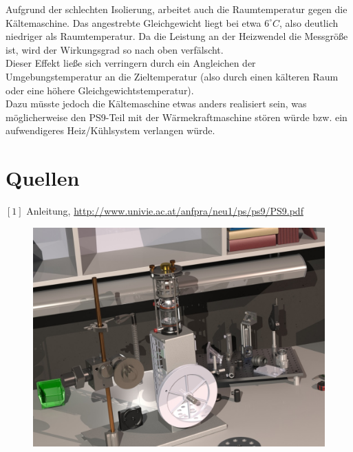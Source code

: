 \documentclass[12pt,a4paper]{article}
\begin{document}
\begin{multicols}{2}
\noindent Aufgrund der schlechten Isolierung, arbeitet auch die Raumtemperatur gegen die Kältemaschine. Das angestrebte Gleichgewicht liegt bei etwa $6^\circ C$, also deutlich niedriger als Raumtemperatur. Da die Leistung an der Heizwendel die Messgröße ist, wird der Wirkungsgrad so nach oben verfälscht.\\
Dieser Effekt ließe sich verringern durch ein Angleichen der Umgebungstemperatur an die Zieltemperatur (also durch einen kälteren Raum oder eine höhere Gleichgewichtstemperatur).\\
Dazu müsste jedoch die Kältemaschine etwas anders realisiert sein, was möglicherweise den PS9-Teil mit der Wärmekraftmaschine stören würde bzw. ein aufwendigeres Heiz/Kühlsystem verlangen würde.\\







\section{Quellen}
$[1]$ Anleitung, \url{http://www.univie.ac.at/anfpra/neu1/ps/ps9/PS9.pdf}\\

\end{multicols}

\begin{figure}[H]
	\centering
	\includegraphics[scale=2]{./data/3D-Model/PS9-model_desk01.JPG}
	\label{fig:stirlingMotor_3D-desktop}
\end{figure}
\end{document}

